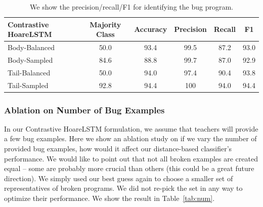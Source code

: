 \documentclass{article}
\begin{document}
\begin{table}[ht]
\centering
\begin{tabular}{@{}lccccc@{}}
\toprule
Contrastive HoareLSTM & Majority Class & Accuracy & Precision & Recall & F1   \\ \midrule
Body-Balanced         & 50.0           & 93.4     & 99.5      & 87.2   & 93.0 \\
Body-Sampled          & 84.6           & 88.8     & 99.7      & 87.0   & 92.9 \\
Tail-Balanced         & 50.0           & 94.0     & 97.4      & 90.4   & 93.8 \\
Tail-Sampled          & 92.8           & 94.4     & 100       & 94.0   & 94.4 \\ \bottomrule
\end{tabular}
\vspace{0.3cm}
\caption{We show the precision/recall/F1 for identifying the bug program.}
\label{tab:sampled}
\end{table}

\subsubsection{Ablation on Number of Bug Examples}

In our Contrastive HoareLSTM formulation, we assume that teachers will provide a few bug examples. Here we show an ablation study on if we vary the number of provided bug examples, how would it affect our distance-based classifier's performance.
We would like to point out that not all broken examples are created equal -- some are probably more crucial than others (this could be a great future direction). We simply used our best guess again to choose a smaller set of representatives of broken programs. We did not re-pick the set in any way to optimize their performance. We show the result in Table~\ref{tab:num}.
\end{document}
